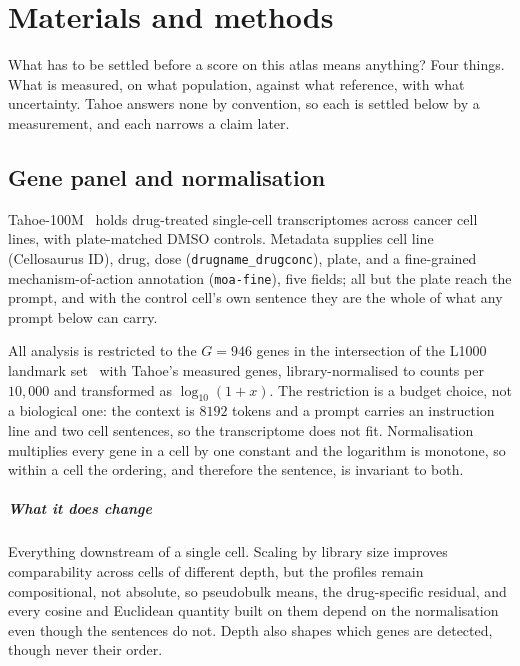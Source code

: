 
\chapter{Materials and methods}
\label{sec:methods-data}

\begin{question}
What has to be settled before a score on this atlas means anything? Four
things. What is measured, on what population, against what reference, with what
uncertainty. Tahoe answers none by convention, so each is settled below by a
measurement, and each narrows a claim later.
\end{question}

\section{Gene panel and normalisation}

Tahoe-100M~\cite{tahoe100m} holds drug-treated single-cell transcriptomes across
cancer cell lines, with plate-matched DMSO controls. Metadata supplies cell line
(Cellosaurus ID), drug, dose (\texttt{drugname\_drugconc}), plate, and a
fine-grained mechanism-of-action annotation (\texttt{moa-fine}), five fields; all but the plate reach the prompt, and with the control cell's own sentence they are the whole of what any prompt below can carry.

All analysis is restricted to the $G = 946$ genes in the intersection of the
L1000 landmark set~\cite{l1000} with Tahoe's measured genes, library-normalised
to counts per $10{,}000$ and transformed as $\log_{10}(1 + x)$. The restriction
is a budget choice, not a biological one: the context is $8192$ tokens and a
prompt carries an instruction line and two cell sentences, so the transcriptome
does not fit. Normalisation multiplies every gene in a cell by one constant and
the logarithm is monotone, so within a cell the ordering, and therefore the
sentence, is invariant to both.

\paragraph{What it does change} Everything downstream of a single cell. Scaling
by library size improves comparability across cells of different depth,
but the profiles remain compositional, not absolute, so pseudobulk means, the
drug-specific residual, and every cosine and Euclidean quantity built on them
depend on the normalisation even though the sentences do not. Depth also shapes
which genes are detected, though never their order.

